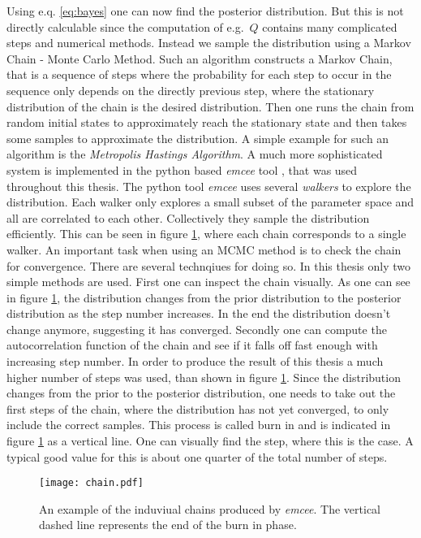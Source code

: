 \documentclass[twoside,a4paper, 12pt]{article}
\numberwithin{equation}{section}
\begin{document}
Using e.q. \eqref{eq:bayes} one can now find the posterior distribution. But this is not directly calculable since the computation
of e.g.\ $Q$ contains many complicated steps and numerical methods.
Instead we sample the distribution using a Markov Chain - Monte Carlo Method.
Such an algorithm constructs a Markov Chain, that is a sequence of steps where the probability for each step to occur in
the sequence only depends on the directly previous step, where the stationary distribution of the chain is
the desired distribution. Then one runs the chain from random initial states to approximately reach the stationary state
and then takes some samples to approximate the distribution. A simple example for such an algorithm is the
\emph{Metropolis Hastings Algorithm}. A much more sophisticated system is implemented in the python based
\emph{emcee} tool \cite{emcee}, that was used throughout this thesis.
The python tool \emph{emcee} uses several \emph{walkers} to explore the distribution.
Each walker only explores a small subset of the parameter space and all are correlated to each other.
Collectively they sample the distribution efficiently. This can be seen in figure \ref{fig:chains}, where
each chain corresponds to a single walker.
An important task when using an MCMC method is to check the chain for convergence.
There are several technqiues for doing so.
In this thesis only two simple methods are used. First one can inspect the chain visually. 
As one can see in figure \ref{fig:chains}, the distribution changes from the prior distribution
to the posterior distribution as the step number increases.
In the end the distribution doesn't change anymore, suggesting it has converged.
Secondly one can compute the autocorrelation function of the chain and see if it falls off fast enough with increasing step number.
In order to produce the result of this thesis a much higher number of steps was used, than shown in figure \ref{fig:chains}.
Since the distribution changes from the prior to the posterior distribution, one needs
to take out the first steps of the chain, where the distribution has not yet converged, 
to only include the correct samples. This process is called burn in and is
indicated in figure \ref{fig:chains} as a vertical line.
One can visually find the step, where this is the case. A typical good value for this is about
one quarter of the total number of steps.
\begin{figure}[H]
    \centering
    \texttt{[image: chain.pdf]}
    \caption{An example of the induviual chains produced by \emph{emcee}.
    The vertical dashed line represents the end of the burn in phase.}
    \label{fig:chains}
\end{figure}
\end{document}
